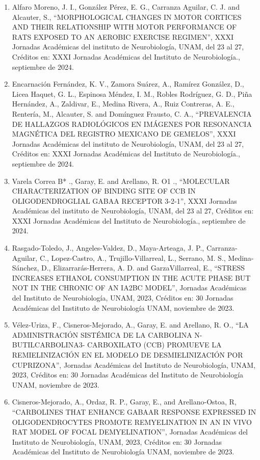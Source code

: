 \documentclass[12pt]{article}
\begin{document}
\begin{enumerate}
\item Alfaro Moreno, J. I., González Pérez, E. G., Carranza Aguilar, C. J. and Alcauter, S., “MORPHOLOGICAL CHANGES IN MOTOR CORTICES 
AND 
THEIR RELATIONSHIP WITH MOTOR PERFORMANCE OF RATS EXPOSED TO AN AEROBIC EXERCISE REGIMEN”, XXXI Jornadas Académicas del instituto de 
Neurobiología, UNAM, del 23 al 27, Créditos en: XXXI Jornadas Académicas del Instituto de Neurobiología., septiembre de 2024.

\item Encarnación Fernández, K. V., Zamora Suárez, A., Ramírez González, D., Licea Haquet, G. L., Espinosa Méndez, I. M., Robles 
Rodríguez, G. D., Piña Hernández, A., Zaldivar, E., Medina Rivera, A., Ruiz Contreras, A. E., Rentería, M., Alcauter, S. and Domínguez 
Frausto, C. A., “PREVALENCIA DE HALLAZGOS RADIOLÓGICOS EN IMÁGENES POR RESONANCIA MAGNÉTICA DEL REGISTRO MEXICANO DE GEMELOS”, XXXI 
Jornadas Académicas del instituto de Neurobiología, UNAM, del 23 al 27, Créditos en: XXXI Jornadas Académicas del Instituto de 
Neurobiología., septiembre de 2024.

\item Varela Correa B* ., Garay, E. and Arellano, R. O1 ., “MOLECULAR CHARACTERIZATION OF BINDING SITE OF CCB IN OLIGODENDROGLIAL GABAA 
RECEPTOR 3-2-1”, XXXI Jornadas Académicas del instituto de Neurobiología, UNAM, del 23 al 27, Créditos en: XXXI Jornadas Académicas 
del Instituto de Neurobiología., septiembre de 2024.

\item Rasgado-Toledo, J., Angeles-Valdez, D., Maya-Arteaga, J. P., Carranza-Aguilar, C., Lopez-Castro, A., 
Trujillo-Villarreal, L., Serrano, M. S., Medina-Sánchez, D., Elizarrarás-Herrera, A. D. and GarzaVillarreal, E., “STRESS INCREASES 
ETHANOL CONSUMPTION IN THE ACUTE PHASE BUT NOT IN THE CHRONIC OF AN IA2BC MODEL”, Jornadas Académicas del Instituto de Neurobiología, 
UNAM, 2023, Créditos en: 30 Jornadas Académicas del Instituto de Neurobiología UNAM, noviembre de 2023.

\item Vélez-Uriza, F., Cisneros-Mejorado, A., Garay, E. and Arellano, R. O., “LA ADMINISTRACIÓN SISTÉMICA DE LA CARBOLINA 
N-BUTILCARBOLINA3- CARBOXILATO (CCB) PROMUEVE LA REMIELINIZACIÓN EN EL MODELO DE DESMIELINIZACIÓN POR CUPRIZONA”, Jornadas 
Académicas del Instituto de Neurobiología, UNAM, 2023, Créditos en: 30 Jornadas Académicas del Instituto de Neurobiología UNAM, 
noviembre de 2023.

\item Cisneros-Mejorado, A., Ordaz, R. P., Garay, E., and Arellano-Ostoa, R, “CARBOLINES THAT ENHANCE GABAAR RESPONSE EXPRESSED IN 
OLIGODENDROCYTES PROMOTE REMYELINATION IN AN IN VIVO RAT MODEL OF FOCAL DEMYELINATION”, Jornadas Académicas del Instituto de 
Neurobiología, UNAM, 2023, Créditos en: 30 Jornadas Académicas del Instituto de Neurobiología UNAM, noviembre de 2023.


\end{enumerate}
\end{document}
